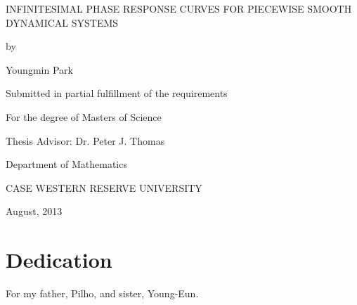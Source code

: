 \documentclass[12pt]{article}
\begin{document}
\pagestyle{empty}
\begin{titlepage}
\begin{center}
INFINITESIMAL PHASE RESPONSE CURVES FOR PIECEWISE SMOOTH DYNAMICAL SYSTEMS\end{center}
\vfill
\begin{center}
by
\end{center}
\begin{center}
Youngmin Park
\end{center}
\vfill
\begin{center}
Submitted in partial fulfillment of the requirements
\end{center}
\begin{center}
For the degree of Masters of Science
\end{center}
\vfill
\begin{center}
Thesis Advisor:  Dr. Peter J. Thomas\\
\end{center}
\vfill
\begin{center}
Department of Mathematics\\ 
\end{center}
\begin{center}
CASE WESTERN RESERVE UNIVERSITY
\end{center}
\vfill
\begin{center}
August, 2013
\vfill
\end{center}
\end{titlepage}



\newpage

\section*{Dedication}
For my father, Pilho, and sister, Young-Eun.
\newpage

\pagestyle{plain}
\tableofcontents
\newpage

\listoftables
{}
\newpage

\listoffigures
{}
\newpage
\end{document}
